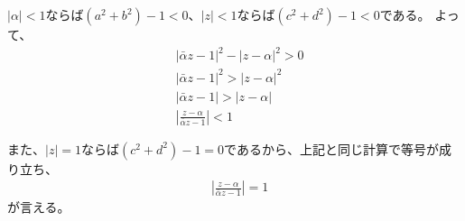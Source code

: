 $|\alpha|<1$ならば$(a^2+b^2)-1<0$、$|z|<1$ならば$(c^2+d^2)-1<0$である。
よって、
\begin{align*}
    &|\bar{\alpha}z-1|^2-|z-\alpha|^2>0\\
    &|\bar{\alpha}z-1|^2>|z-\alpha|^2\\
    &|\bar{\alpha}z-1|>|z-\alpha|\\
    &\left|\frac{z-\alpha}{\bar{\alpha}z-1}\right|<1
\end{align*}

また、$|z|=1$ならば$(c^2+d^2)-1=0$であるから、上記と同じ計算で等号が成り立ち、
\begin{align*}
    &\left|\frac{z-\alpha}{\bar{\alpha}z-1}\right|=1
\end{align*}
が言える。